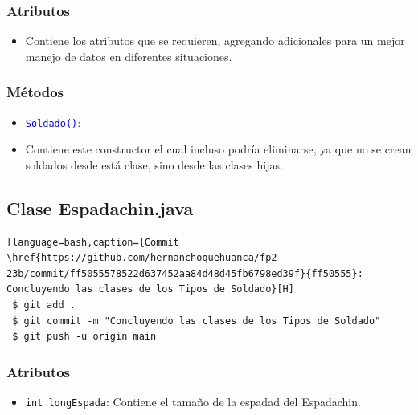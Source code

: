 \documentclass{article}
\begin{document}
\subsubsection{Atributos}
\begin{itemize}
    \item Contiene los atributos que se requieren, agregando adicionales para un mejor manejo de datos en diferentes situaciones.
\end{itemize}


\subsubsection{Métodos}
\begin{itemize}
    \item \texttt{\textcolor{blue}{Soldado()}}: 
    \item Contiene este constructor el cual incluso podría eliminarse, ya que no se crean soldados desde está clase, sino desde las clases hijas.
\end{itemize}



\newpage
\subsection{Clase Espadachin.java}
\begin{lstlisting}[language=bash,caption={Commit \href{https://github.com/hernanchoquehuanca/fp2-23b/commit/ff5055578522d637452aa84d48d45fb6798ed39f}{ff50555}: Concluyendo las clases de los Tipos de Soldado}[H]
 $ git add .
 $ git commit -m "Concluyendo las clases de los Tipos de Soldado"			
 $ git push -u origin main
\end{lstlisting}

\subsubsection{Atributos}
\begin{itemize}
    \item \texttt{int longEspada}: Contiene el tamaño de la espadad del Espadachin.
\end{itemize}

\end{document}
